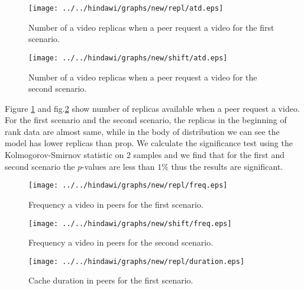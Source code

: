 \begin{figure}[!t]
\begin{center}
\texttt{[image: ../../hindawi/graphs/new/repl/atd.eps]}
\end{center}
\caption{Number of a video replicas when a peer request a video for the first scenario.}
\label{fig:atd-normal}
\end{figure} 

\begin{figure}[!t]
\begin{center}
\texttt{[image: ../../hindawi/graphs/new/shift/atd.eps]}
\end{center}
\caption{Number of a video replicas when a peer request a video for the second scenario.}
\label{fig:atd-shift}
\end{figure} 

Figure \ref{fig:atd-normal} and fig.\ref{fig:atd-shift} show number of replicas available when a peer request a video.  
For the first scenario and the second scenario, the replicas in the beginning of rank data are almost same, while in the body of distribution we can see the model has lower replicas than prop. 
We calculate the significance test using the Kolmogorov-Smirnov statistic on 2 samples and we find that for the first and second scenario the $p$-values are less than $1$\% thus the results are significant. 


\begin{figure}[!t]
\begin{center}
\texttt{[image: ../../hindawi/graphs/new/repl/freq.eps]}
\end{center}
\caption{Frequency a video in peers for the first scenario.}
\label{fig:freq-normal}
\end{figure} 

\begin{figure}[!t]
\begin{center}
\texttt{[image: ../../hindawi/graphs/new/shift/freq.eps]}
\end{center}
\caption{Frequency a video in peers for the second scenario.}
\label{fig:freq-shift}
\end{figure} 


\begin{figure}[!t]
\begin{center}
\texttt{[image: ../../hindawi/graphs/new/repl/duration.eps]}
\end{center}
\caption{Cache duration in peers for the first scenario.}
\label{fig:duration-normal}
\end{figure} 

